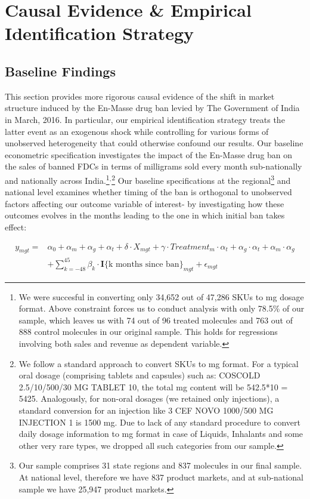 \documentclass[AER]{AEA}
\theoremstyle{theorem}
\begin{document}
\section{Causal Evidence \& Empirical Identification Strategy}

\subsection{Baseline Findings}

This section provides more rigorous causal evidence of the shift in market structure induced by the En-Masse drug ban levied by The Government of India in March, 2016. In particular, our empirical identification strategy treats the latter event as an exogenous shock while controlling for various forms of unobserved heterogeneity that could otherwise confound our results. Our baseline econometric specification investigates the impact of the En-Masse drug ban on the sales of banned FDCs in terms of milligrams sold every month sub-nationally and nationally across India.\footnote{We were succesful in converting only 34,652 out of 47,286 SKUs to mg dosage format. Above constraint forces us to conduct analysis with only 78.5\% of our sample, which leaves us with 74 out of 96 treated molecules and 763 out of 888 control molecules in our original sample. This holds for regressions involving both sales and revenue as dependent variable.}$^{,}$\footnote{We follow a standard approach to convert SKUs to mg format. For a typical oral dosage (comprising tablets and capsules) such as: COSCOLD 2.5/10/500/30 MG TABLET 10, the total mg content will be 542.5*10 = 5425. Analogously, for non-oral dosages (we retained only injections), a standard conversion for an injection like 3 CEF NOVO 1000/500 MG INJECTION 1 is 1500 mg. Due to lack of any standard procedure to convert daily dosage information to mg format in case of Liquids, Inhalants and some other very rare types, we dropped all such categories from our sample.} Our baseline specifications at the regional\footnote{Our sample comprises 31 state regions and 837 molecules in our final sample. At national level, therefore we have 837 product markets, and at sub-national sample we have 25,947 product markets.} and national level examines whether timing of the ban is orthogonal to unobserved factors affecting our outcome variable of interest- by investigating how these outcomes evolves in the months leading to the one in which initial ban takes effect:


\begin{equation}\label{Eq_1}
	\begin{aligned}
y_{mgt} =& \alpha_{0} + \alpha_{m}  + \alpha_{g} + \alpha_{t} +  \delta \cdot X_{mgt} +  \gamma \cdot Treatment_{m} \cdot \alpha_{t} + \alpha_{g} \cdot \alpha_{t} + \alpha_{m} \cdot \alpha_{g} \\
  & + \sum_{k = -48}^{45}\beta_{k} \cdot \mathbf{I}\{\text{k months since ban}\}_{mgt} +  \epsilon_{mgt}
	\end{aligned}
\end{equation}
\end{document}
